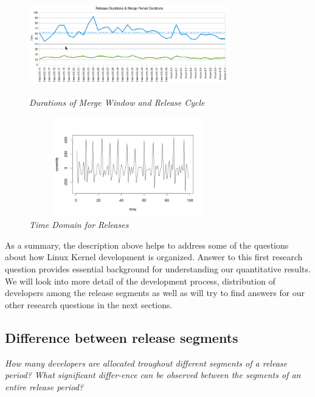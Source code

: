\documentclass{acm_proc_article-sp}
\begin{document}
\begin{figure}
\begin{center}
\includegraphics[height=1.7in,width=3.4in]{linxrelmergfreq.png}
\caption{\small \sl Durations of Merge Window and Release Cycle}
\end{center}
\end{figure}

\begin{figure}
\begin{center}
\includegraphics[height=1.7in,width=3.4in]{relTimeDomain100.png}
\caption{\small \sl Time Domain for Releases}
\end{center}
\end{figure}

As a summary, the description above helps to address some of the questions about how Linux Kernel development is organized. Answer to this first research question provides essential background for understanding our quantitative results. We will look into more detail of the development process, distribution of developers among the release segments as well as will try to find answers for our other research questions in the next sections.

\subsection{Difference between release segments}
\textit{How many developers are allocated troughout different segments of a release period? What significant differ-ence can be observed between the segments of an entire release period?}
\end{document}
